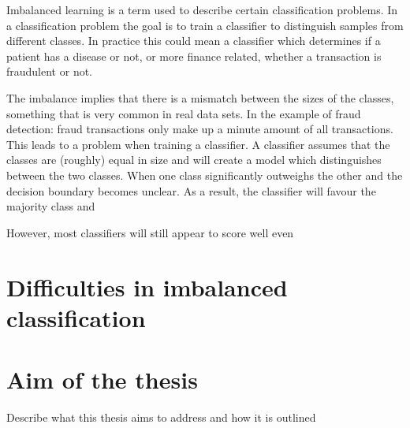 
Imbalanced learning is a term used to describe certain classification problems. In a classification problem the goal is to train a classifier to distinguish samples from different classes. In practice this could mean a classifier which determines if a patient has a disease or not, or more finance related, whether a transaction is fraudulent or not.

The imbalance implies that there is a mismatch between the sizes of the classes, something that is very common in real data sets. In the example of fraud detection: fraud transactions only make up a minute amount of all transactions. This leads to a problem when training a classifier. A classifier assumes that the classes are (roughly) equal in size and will create a model which distinguishes between the two classes. When one class significantly outweighs the other and the decision boundary becomes unclear. As a result, the classifier will favour the majority class and 

However, most classifiers will still appear to score well even 

\section{Difficulties in imbalanced classification}

\section{Aim of the thesis}
Describe what this thesis aims to address and how it is outlined